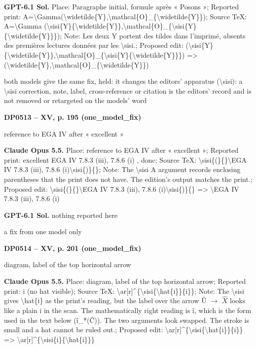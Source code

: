 \textbf{GPT-6.1 Sol.} Place: Paragraphe initial, formule après « Posons »; Reported print: A=\allowbreak \textbackslash{}Gamma(\textbackslash{}widetilde\{Y\},\textbackslash{}mathcal\{O\}\_\{\textbackslash{}widetilde\{Y\}\}); Source TeX: A=\allowbreak \textbackslash{}Gamma (\textbackslash{}sisi\{Y\}\{\textbackslash{}widetilde\{Y\}\},\textbackslash{}mathcal\{O\}\_\{\textbackslash{}sisi\{Y\}\{\textbackslash{}widetilde\{Y\}\}\}); Note: Les deux Y portent des tildes dans l'imprimé, absents des premières lectures données par les \textbackslash{}sisi.; Proposed edit: (\textbackslash{}sisi\{Y\}\{\textbackslash{}widetilde\{Y\}\},\textbackslash{}mathcal\{O\}\_\{\textbackslash{}sisi\{Y\}\{\textbackslash{}widetilde\{Y\}\}\}) =\allowbreak > (\textbackslash{}widetilde\{Y\},\textbackslash{}mathcal\{O\}\_\{\textbackslash{}widetilde\{Y\}\})\par
both models give the same fix, held: it changes the editors' apparatus (\textbackslash{}sisi): a \textbackslash{}sisi correction, note, label, cross-reference or citation is the editors' record and is not removed or retargeted on the models' word\par
\par\noindent\hypertarget{DP0513}{}\textbf{DP0513 -- XV, p. 195 (one\_model\_fix)}\par
reference to EGA IV after « excellent »\par
\textbf{Claude Opus 5.5.} Place: reference to EGA IV after « excellent »; Reported print: excellent EGA IV 7.8.3 (iii), 7.8.6 (i) , donc; Source TeX: \textbackslash{}sisi\{(\}\{\}\textbackslash{}EGA IV 7.8.3 (iii), 7.8.6 (i)\textbackslash{}sisi\{)\}\{\}; Note: The \textbackslash{}sisi A argument records enclosing parentheses that the print does not have. The edition's output matches the print.; Proposed edit: \textbackslash{}sisi\{(\}\{\}\textbackslash{}EGA IV 7.8.3 (iii), 7.8.6 (i)\textbackslash{}sisi\{)\}\{\} =\allowbreak > \textbackslash{}EGA IV 7.8.3 (iii), 7.8.6 (i)\par
\textbf{GPT-6.1 Sol.} nothing reported here\par
a fix from one model only\par
\par\noindent\hypertarget{DP0514}{}\textbf{DP0514 -- XV, p. 201 (one\_model\_fix)}\par
diagram, label of the top horizontal arrow\par
\textbf{Claude Opus 5.5.} Place: diagram, label of the top horizontal arrow; Reported print: i (no hat visible); Source TeX: \textbackslash{}ar[r]\textasciicircum{}\{\textbackslash{}sisi\{\textbackslash{}hat\{i\}\}\{i\}\}; Note: The \textbackslash{}sisi gives \textbackslash{}hat\{i\} as the print's reading, but the label over the arrow Û \ensuremath{\to} \ensuremath{\hat{X}} looks like a plain i in the scan. The mathematically right reading is î, which is the form used in the text below (î\_*(Ĉ)). The two arguments look swapped. The stroke is small and a hat cannot be ruled out.; Proposed edit: \textbackslash{}ar[r]\textasciicircum{}\{\textbackslash{}sisi\{\textbackslash{}hat\{i\}\}\{i\}\} =\allowbreak > \textbackslash{}ar[r]\textasciicircum{}\{\textbackslash{}sisi\{i\}\{\textbackslash{}hat\{i\}\}\}\par
